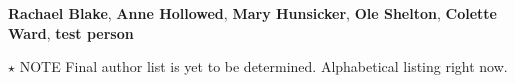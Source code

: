 \textbf{Rachael Blake}, 
\textbf{Anne Hollowed}, 
\textbf{Mary Hunsicker}, 
\textbf{Ole Shelton}, 
\textbf{Colette Ward},
\textbf{test person}

$\star$ NOTE Final author list is yet to be determined. Alphabetical listing right now. 
